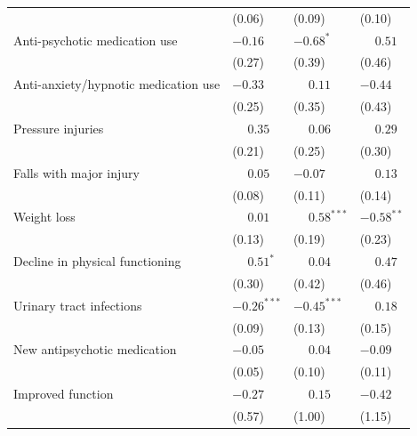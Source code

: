 \begin{table}[!ht]
\begin{threeparttable}
\begin{tabularx}{\textwidth}{@{} l Y Y Y @{}}
 & (0.06) & (0.09) & (0.10) \\[3pt]
Anti-psychotic medication use & $-0.16$ & $-0.68^{*}$ & $\phantom{-}0.51$ \\
 & (0.27) & (0.39) & (0.46) \\[3pt]
Anti-anxiety/hypnotic medication use & $-0.33$ & $\phantom{-}0.11$ & $-0.44$ \\
 & (0.25) & (0.35) & (0.43) \\[3pt]
Pressure injuries & $\phantom{-}0.35$ & $\phantom{-}0.06$ & $\phantom{-}0.29$ \\
 & (0.21) & (0.25) & (0.30) \\[3pt]
Falls with major injury & $\phantom{-}0.05$ & $-0.07$ & $\phantom{-}0.13$ \\
 & (0.08) & (0.11) & (0.14) \\[3pt]
Weight loss & $\phantom{-}0.01$ & $\phantom{-}0.58^{***}$ & $-0.58^{**}$ \\
 & (0.13) & (0.19) & (0.23) \\[3pt]
Decline in physical functioning & $\phantom{-}0.51^{*}$ & $\phantom{-}0.04$ & $\phantom{-}0.47$ \\
 & (0.30) & (0.42) & (0.46) \\[3pt]
Urinary tract infections & $-0.26^{***}$ & $-0.45^{***}$ & $\phantom{-}0.18$ \\
 & (0.09) & (0.13) & (0.15) \\[3pt]
New antipsychotic medication & $-0.05$ & $\phantom{-}0.04$ & $-0.09$ \\
 & (0.05) & (0.10) & (0.11) \\[3pt]
Improved function & $-0.27$ & $\phantom{-}0.15$ & $-0.42$ \\
 & (0.57) & (1.00) & (1.15) \\[3pt]
\bottomrule
\end{tabularx}


\end{threeparttable}
\end{table}
